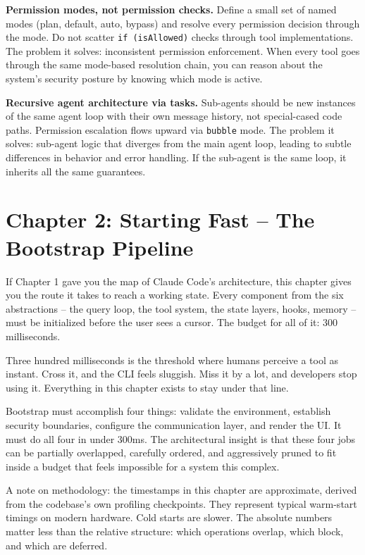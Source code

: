 \documentclass[
  english,
  11pt,
  letterpaper,
]{book}
\begin{document}
\textbf{Permission modes, not permission checks.} Define a small set of
named modes (plan, default, auto, bypass) and resolve every permission
decision through the mode. Do not scatter \texttt{if\ (isAllowed)}
checks through tool implementations. The problem it solves: inconsistent
permission enforcement. When every tool goes through the same mode-based
resolution chain, you can reason about the system's security posture by
knowing which mode is active.

\textbf{Recursive agent architecture via tasks.} Sub-agents should be
new instances of the same agent loop with their own message history, not
special-cased code paths. Permission escalation flows upward via
\texttt{bubble} mode. The problem it solves: sub-agent logic that
diverges from the main agent loop, leading to subtle differences in
behavior and error handling. If the sub-agent is the same loop, it
inherits all the same guarantees.

\chapter{Chapter 2: Starting Fast -- The Bootstrap
Pipeline}\label{chapter-2-starting-fast-the-bootstrap-pipeline}

If Chapter 1 gave you the map of Claude Code's architecture, this
chapter gives you the route it takes to reach a working state. Every
component from the six abstractions -- the query loop, the tool system,
the state layers, hooks, memory -- must be initialized before the user
sees a cursor. The budget for all of it: 300 milliseconds.

Three hundred milliseconds is the threshold where humans perceive a tool
as instant. Cross it, and the CLI feels sluggish. Miss it by a lot, and
developers stop using it. Everything in this chapter exists to stay
under that line.

Bootstrap must accomplish four things: validate the environment,
establish security boundaries, configure the communication layer, and
render the UI. It must do all four in under 300ms. The architectural
insight is that these four jobs can be partially overlapped, carefully
ordered, and aggressively pruned to fit inside a budget that feels
impossible for a system this complex.

A note on methodology: the timestamps in this chapter are approximate,
derived from the codebase's own profiling checkpoints. They represent
typical warm-start timings on modern hardware. Cold starts are slower.
The absolute numbers matter less than the relative structure: which
operations overlap, which block, and which are deferred.
\end{document}
